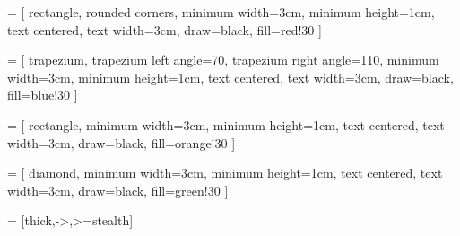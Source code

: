 \usepackage{tikz}
\usepackage{pgfplots}
\pgfplotsset{compat=1.18}

\usetikzlibrary{arrows, automata, shapes.geometric, positioning, fit, calc, backgrounds}

 = [
  rectangle, rounded corners,
  minimum width=3cm, minimum height=1cm,
  text centered, text width=3cm,
  draw=black, fill=red!30
]

 = [
  trapezium, trapezium left angle=70, trapezium right angle=110,
  minimum width=3cm, minimum height=1cm,
  text centered, text width=3cm,
  draw=black, fill=blue!30
]

 = [
  rectangle,
  minimum width=3cm, minimum height=1cm,
  text centered, text width=3cm,
  draw=black, fill=orange!30
]

 = [
  diamond,
  minimum width=3cm, minimum height=1cm,
  text centered, text width=3cm,
  draw=black, fill=green!30
]

 = [thick,->,>=stealth]
